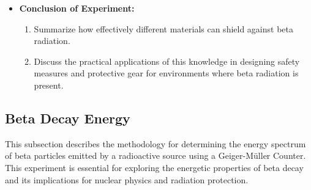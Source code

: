\documentclass[11pt]{article}
\begin{document}
\begin{itemize}
		\item \textbf{Conclusion of Experiment:}
		\begin{enumerate}
			\item Summarize how effectively different materials can shield against beta radiation.
			\item Discuss the practical applications of this knowledge in designing safety measures and protective gear for environments where beta radiation is present.
		\end{enumerate}
	\end{itemize}
			
	\subsection{Beta Decay Energy}
	
	This subsection describes the methodology for determining the energy spectrum of beta particles emitted by a radioactive source using a Geiger-Müller Counter. This experiment is essential for exploring the energetic properties of beta decay and its implications for nuclear physics and radiation protection.
	
\end{document}
